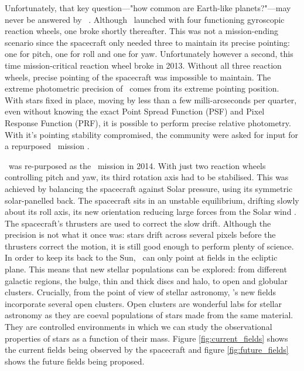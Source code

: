 Unfortunately, that key question---"how common are Earth-like planets?"---may
never be answered by \kepler\ \citep[or at least not very precisely, several
inferences have been performed by extrapolation, \eg][]{Foreman-Mackey2014,
Petigura2013, Burke2015}.
Although \kepler\ launched with four functioning gyroscopic reaction wheels,
one broke shortly thereafter.
This was not a mission-ending scenario since the spacecraft only needed three
to maintain its precise pointing: one for pitch, one for roll and one for yaw.
Unfortunately however a second, this time mission-critical reaction wheel
broke in 2013.
Without all three reaction wheels, precise pointing of the spacecraft was
impossible to maintain.
The extreme photometric precision of \kepler\ comes from its extreme pointing
position.
With stars fixed in place, moving by less than a few milli-arcseconds per
quarter, even without knowing the exact Point Spread Function (PSF) and Pixel
Response Function (PRF), it is possible to perform precise relative
photometry.
With it's pointing stability compromised, the community were asked for input
for a repurposed \kepler\ mission \citep[\eg][]{Hogg2013, Aigrain2015}.

\kepler\ was re-purposed as the \ktwo\ mission in 2014.
With just two reaction wheels controlling pitch and yaw, its third rotation
axis had to be stabilised.
This was achieved by balancing the spacecraft against Solar pressure, using
its symmetric solar-panelled back.
The spacecraft sits in an unstable equilibrium, drifting slowly about its roll
axis, its new orientation reducing large forces from the Solar wind
\citep{Howell2014}.
The spacecraft's thrusters are used to correct the slow drift.
Although the precision is not what it once was: stars drift across several
pixels before the thrusters correct the motion, it is still good enough to
perform plenty of science.
In order to keep its back to the Sun, \kepler\ can only point at fields in the
ecliptic plane.
This means that new stellar populations can be explored: from different
galactic regions, the bulge, thin and thick discs and halo, to open and
globular clusters.
Crucially, from the point of view of stellar astronomy, \kepler's new fields
incorporate several open clusters.
Open clusters are wonderful labs for stellar astronomy as they are coeval
populations of stars made from the same material.
They are controlled environments in which we can study the observational
properties of stars as a function of their mass.
Figure \ref{fig:current_fields} shows the current fields being observed by the
spacecraft and figure \ref{fig:future_fields} shows the future fields being
proposed.

